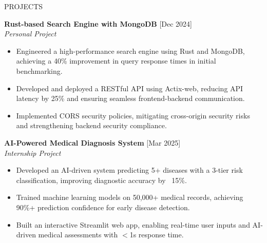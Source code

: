 \documentclass{resume} %
\begin{document}
\begin{rSection}{PROJECTS}

    \textbf{Rust-based Search Engine with MongoDB} \hfill [Dec 2024] \\
\textit{Personal Project} \vspace{0.1em}
\begin{itemize}
    \itemsep -3pt
    \item Engineered a high-performance search engine using Rust and MongoDB, achieving a 40\% improvement in query response times in initial benchmarking.
    \item Developed and deployed a RESTful API using Actix-web, reducing API latency by 25\% and ensuring seamless frontend-backend communication.
    \item Implemented CORS security policies, mitigating cross-origin security risks and strengthening backend security compliance.
\end{itemize}

\vspace{0.2em}
\textbf{AI-Powered Medical Diagnosis System} \hfill [Mar 2025] \\
\textit{Internship Project} \vspace{0.1em}
\begin{itemize}
    \itemsep -3pt
    \item Developed an AI-driven system predicting 5+ diseases with a 3-tier risk classification, improving diagnostic accuracy by ~15\%.
    \item Trained machine learning models on 50,000+ medical records, achieving 90\%+ prediction confidence for early disease detection.
    \item Built an interactive Streamlit web app, enabling real-time user inputs and AI-driven medical assessments with $<$1s response time.
\end{itemize}

\end{rSection}


\newpage
\end{document}
